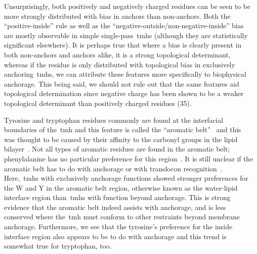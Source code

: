 Unsurprisingly, both positively and negatively charged residues can be seen to be more strongly distributed with bias in anchors than non-anchors.
Both the ``positive-inside'' rule as well as the ``negative-outside/non-negative-inside'' bias are mostly observable in simple single-pass~\gls{tmh}s (although they are statistically significant elsewhere).
It is perhaps true that where a bias is clearly present in both non-anchors and anchors alike, it is a strong topological determinant, whereas if the residue is only distributed with topological bias in exclusively anchoring~\gls{tmh}s, we can attribute these features more specifically to biophysical anchorage.
This being said, we should not rule out that the same features aid topological determination since negative charge has been shown to be a weaker topological determinant than positively charged residues (35).

Tyrosine and tryptophan residues commonly are found at the interfacial boundaries of the~\gls{tmh} and this feature is called the ``aromatic belt''~\cite{Sharpe2010, Baeza-Delgado2013, Granseth2005, Nilsson2005a, Hessa2005} and this was thought to be caused by their affinity to the carbonyl groups in the lipid bilayer~\cite{Killian2000}.
Not all types of aromatic residues are found in the aromatic belt; phenylalanine has no particular preference for this region~\cite{Granseth2005, Braun1999}.
It is still unclear if the aromatic belt has to do with anchorage or with translocon recognition~\cite{Baeza-Delgado2013}.
Here,~\gls{tmh}s with exclusively anchorage functions showed stronger preferences for the W and Y in the aromatic belt region, otherwise known as the water-lipid interface region than~\gls{tmh}s with function beyond anchorage.
This is strong evidence that the aromatic belt indeed assists with anchorage, and is less conserved where the~\gls{tmh} must conform to other restraints beyond membrane anchorage.
Furthermore, we see that the tyrosine's preference for the inside interface region also appears to be to do with anchorage and this trend is somewhat true for tryptophan, too.

